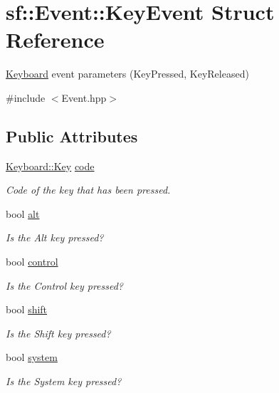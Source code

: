 \hypertarget{structsf_1_1_event_1_1_key_event}{\section{sf\-:\-:Event\-:\-:Key\-Event Struct Reference}
\label{structsf_1_1_event_1_1_key_event}
}


\hyperlink{classsf_1_1_keyboard}{Keyboard} event parameters (Key\-Pressed, Key\-Released)  




{\ttfamily \#include $<$Event.\-hpp$>$}

\subsection*{Public Attributes}
\begin{DoxyCompactItemize}
\item 
\hyperlink{classsf_1_1_keyboard_acb4cacd7cc5802dec45724cf3314a142}{Keyboard\-::\-Key} \hyperlink{structsf_1_1_event_1_1_key_event_a2879fdab8a68cb1c6ecc45730a2d0e61}{code}
\begin{DoxyCompactList}\small\item\em Code of the key that has been pressed. \end{DoxyCompactList}\item 
bool \hyperlink{structsf_1_1_event_1_1_key_event_a915a483317de67d995188a855701fbd7}{alt}
\begin{DoxyCompactList}\small\item\em Is the Alt key pressed? \end{DoxyCompactList}\item 
bool \hyperlink{structsf_1_1_event_1_1_key_event_a9255861c2f88501d80ad6b44a310b62f}{control}
\begin{DoxyCompactList}\small\item\em Is the Control key pressed? \end{DoxyCompactList}\item 
bool \hyperlink{structsf_1_1_event_1_1_key_event_a776af1a3ca79abeeec18ebf1c0065aa9}{shift}
\begin{DoxyCompactList}\small\item\em Is the Shift key pressed? \end{DoxyCompactList}\item 
bool \hyperlink{structsf_1_1_event_1_1_key_event_ac0557f7edc2a608ec65175fdd843afc5}{system}
\begin{DoxyCompactList}\small\item\em Is the System key pressed? \end{DoxyCompactList}\end{DoxyCompactItemize}


